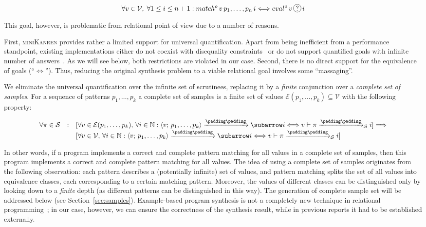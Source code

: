 \[
\forall v\in \mathcal V,\; \forall 1\le i\le n+1 : match^o\,v\,p_1,\dots,p_n\,i\Longleftrightarrow eval^o\,v\,\circled{?}\,i
\]

\noindent This goal, however, is problematic from relational point of view due to a number of reasons.

First, \textsc{miniKanren} provides rather a limited support for universal quantification. Apart from being inefficient from
a performance standpoint, existing implementations either do not coexist with disequality constraints~\cite{eigen}
or do not support quantified goals with infinite number of answers~\cite{moiseenko}. As we will see below, both restrictions are
violated in our case. Second, there is no direct support for the equivalence of goals (``$\Leftrightarrow$''). Thus,
reducing the original synthesis problem to a viable relational goal involves some ``massaging''.

We eliminate the universal quantification over the infinite set of scrutinees, replacing it by a \emph{finite}
conjunction over a \emph{complete set of samples}. For a sequence of patterns $p_1,\dots,p_k$ a
complete set of samples is a finite set of values $\mathcal{E}(p_1,\dots,p_k)\subseteq\mathcal{V}$ with the following
property:

\[
\setarrow{\xrightarrow}
\begin{array}{rcl}
  \forall\pi\in\mathcal S & : & [\forall v\in\mathcal{E}(p_1,\dots,p_k),\,\forall i\in\mathbb{N} : \trans{\inbr{v;\,p_1,\dots,p_k}}{}{i} \Longleftrightarrow {\setsubarrow{_{\mathcal S}}\withenv{v}{\trans{\pi}{}{i}}}] \Longrightarrow \\
                          &   & [\forall v\in\mathcal V,\,\forall i\in\mathbb{N} : \trans{\inbr{v;\,p_1,\dots,p_k}}{}{i} \Longleftrightarrow  {\setsubarrow{_{\mathcal S}}\withenv{v}{\trans{\pi}{}{i}}}]
\end{array}
\]

In other words, if a program implements a correct and complete pattern matching for all values in a complete set of samples, then this
program implements a correct and complete pattern matching for all values. The idea of using a complete set of samples originates from the following observation: each pattern
describes a (potentially infinite) set of values, and pattern matching splits the set of all values into equivalence classes, each corresponding to a certain matching pattern.
Moreover, the values of different classes can be distinguished only by looking down to a \emph{finite} depth (as different patterns can be distinguished in this way).
The generation of complete sample set will be addressed below (see Section~\ref{sec:samples}). Example-based program synthesis is not a completely new technique in relational
programming~\cite{unified}; in our case, however, we can ensure the correctness of the synthesis result, while in previous reports it had to be established externally.


